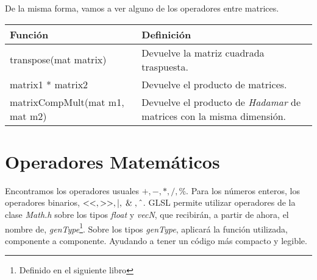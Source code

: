 De la misma forma, vamos a ver alguno de los operadores entre matrices.
\begin{table}[h]
    \begin{tabularx}{\textwidth}{l|X}
      \toprule
      Función & Definición\\
      \midrule
      transpose(mat matrix) & Devuelve la matriz cuadrada traspuesta.\\
      matrix1 * matrix2 & Devuelve el producto de matrices. \\
      matrixCompMult(mat m1, mat m2) & Devuelve el producto de \textit{Hadamar} de matrices con la misma dimensión. \\
      \bottomrule
    \end{tabularx}
\end{table}
\newpage
\section{Operadores Matemáticos}
Encontramos los operadores usuales \(+,-,*,/,\%\). Para los números enteros, los operadores binarios, \({<<, >>, \mid, \And, \string^}\). GLSL permite utilizar operadores de la clase \textit{Math.h} sobre los tipos \textit{float} y \textit{vecN}, que recibirán, a partir de ahora, el nombre de, \textit{genType}\footnote{Definido en el siguiente libro}. Sobre los tipos \textit{genType}, aplicará la función utilizada, componente a componente. Ayudando a tener un código más compacto y legible.
